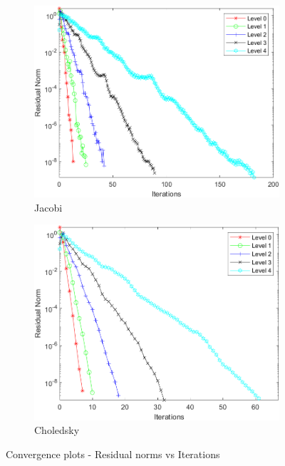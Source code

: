 \documentclass[a4paper, 11pt]{article}
\begin{document}
				\begin{figure}[H]
					\begin{subfigure}{.49\textwidth}
						\centering
						\includegraphics[width=.99\linewidth]{ConvergenceJ.png}  
						\caption{Jacobi}
						\label{fig:Jacobi}
					\end{subfigure}
					\begin{subfigure}{.49\textwidth}
						\centering
						\includegraphics[width=.99\linewidth]{ConvergenceC.png}  
						\caption{Choledsky}
						\label{fig:Chol}
					\end{subfigure}
					\caption{Convergence plots - Residual norms vs Iterations}
					\label{fig:convergence}
				\end{figure}
				
\end{document}
